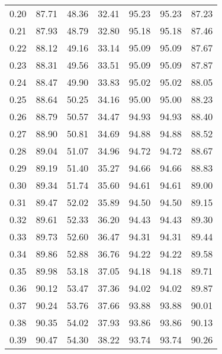 \begin{tabular}{|c|c|c|c|c|c|c|}
      0.20 &     87.71 &     48.36 &      32.41 &   95.23 &      95.23 &         87.23 \\
      0.21 &     87.93 &     48.79 &      32.80 &   95.18 &      95.18 &         87.46 \\
      0.22 &     88.12 &     49.16 &      33.14 &   95.09 &      95.09 &         87.67 \\
      0.23 &     88.31 &     49.56 &      33.51 &   95.09 &      95.09 &         87.87 \\
      0.24 &     88.47 &     49.90 &      33.83 &   95.02 &      95.02 &         88.05 \\
      0.25 &     88.64 &     50.25 &      34.16 &   95.00 &      95.00 &         88.23 \\
      0.26 &     88.79 &     50.57 &      34.47 &   94.93 &      94.93 &         88.40 \\
      0.27 &     88.90 &     50.81 &      34.69 &   94.88 &      94.88 &         88.52 \\
      0.28 &     89.04 &     51.07 &      34.96 &   94.72 &      94.72 &         88.67 \\
      0.29 &     89.19 &     51.40 &      35.27 &   94.66 &      94.66 &         88.83 \\
      0.30 &     89.34 &     51.74 &      35.60 &   94.61 &      94.61 &         89.00 \\
      0.31 &     89.47 &     52.02 &      35.89 &   94.50 &      94.50 &         89.15 \\
      0.32 &     89.61 &     52.33 &      36.20 &   94.43 &      94.43 &         89.30 \\
      0.33 &     89.73 &     52.60 &      36.47 &   94.31 &      94.31 &         89.44 \\
      0.34 &     89.86 &     52.88 &      36.76 &   94.22 &      94.22 &         89.58 \\
      0.35 &     89.98 &     53.18 &      37.05 &   94.18 &      94.18 &         89.71 \\
      0.36 &     90.12 &     53.47 &      37.36 &   94.02 &      94.02 &         89.87 \\
      0.37 &     90.24 &     53.76 &      37.66 &   93.88 &      93.88 &         90.01 \\
      0.38 &     90.35 &     54.02 &      37.93 &   93.86 &      93.86 &         90.13 \\
      0.39 &     90.47 &     54.30 &      38.22 &   93.74 &      93.74 &         90.26 \\

\end{tabular}
